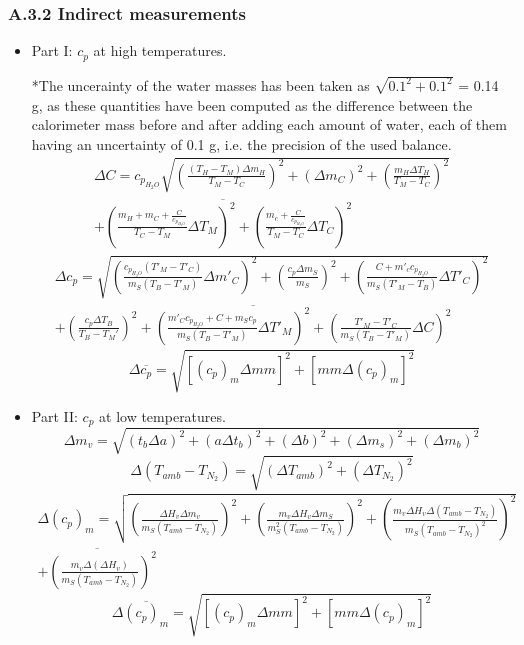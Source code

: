 \documentclass[a4paper, 12pt]{article}
\begin{document}
	\subsubsection{A.3.2 Indirect measurements}
	\begin{itemize}
		\item Part I: $c_p$ at high temperatures.
		
		*The uncerainty of the water masses has been taken as $\sqrt{0.1^2 + 0.1^2}$ = 0.14 g, as these quantities have been computed as the difference between the calorimeter mass before and after adding each amount of water, each of them having an uncertainty of 0.1 g, i.e. the precision of the used balance.
		\begin{multline}\label{dccalorimeter}
			\Delta C = c_{p_{H_2O}} \sqrt{\left(\frac{(T_H - T_M) \Delta m_H}{T_M - T_C}\right)^2 + (\Delta m_C)^2 + \left(\frac{m_H \Delta T_H}{T_M - T_C}\right)^2} \\ \overline{+ \left(\frac{m_H + m_C + %
					 \frac{C}{c_{p_{H_2O}}}}{T_C - T_M}\Delta T_M\right)^2 + \left(\frac{m_c + %
					 \frac{C}{c_{p_{H_2O}}}}{T_M - T_C}\Delta T_C\right)^2}
		\end{multline}
		\begin{multline}\label{dcp}
		\Delta c_p = \sqrt{\left(\frac{c_{p_{H_2O}} (T'_M - T'_C)}{m_S(T_B - T'_M)}\Delta m'_C \right)^2 + \left(\frac{c_p \Delta m_S}{m_S}\right)^2 + \left(\frac{C + m'_c c_{p_{H_2O}} }{m_S (T'_M - T_B)}\Delta T'_C\right)^2} \\ \overline{+ \left(\frac{c_p \Delta T_B}{T_B - T_M'}\right)^2 + \left(\frac{m'_C c_{p_{H_2O}} + C + m_S c_p}{m_S(T_B - T'_M)}\Delta T'_M\right)^2 + \left(\frac{T'_M - T'_C}{m_S(T_B - T'_M)}\Delta C\right)^2}
		\end{multline}
	\begin{equation}
		\Delta \overline{c_p} = \sqrt{[(c_p)_m\Delta mm]^2 + [mm \Delta (c_p)_m ]^2}
	\end{equation}
	\item Part II: $c_p$ at low temperatures.
\begin{equation}\label{dmvlow}
		\Delta m_v = \sqrt{(t_b\Delta a)^2 + (a\Delta t_b)^2 + (\Delta b)^2 + (\Delta m_s)^2 + (\Delta m_b)^2}
\end{equation}
\begin{equation}
	\Delta (T_{amb} - T_{N_2}) = \sqrt{(\Delta T_{amb})^2 + (\Delta T_{N_2})^2}
\end{equation}
\begin{multline}
	\Delta (c_p)_m = \sqrt{\left(\frac{\Delta H_v \Delta m_v}{m_S(T_{amb} - T_{N_2})}\right)^2 + \left(\frac{m_v\Delta H_v \Delta m_S}{m_S^2(T_{amb} - T_{N_2})}\right)^2 + \left(\frac{m_v\Delta H_v \Delta (T_{amb} - T_{N_2})}{m_S (T_{amb} - T_{N_2})^2}\right)^2 } \\ \overline{+ \left(\frac{m_v\Delta (\Delta H_v)}{m_S(T_{amb} - T_{N_2})}\right)^2}
\end{multline}
\begin{equation}
	\Delta \overline{(c_p)_m} = \sqrt{[(c_p)_m\Delta mm]^2 + [mm \Delta (c_p)_m ]^2}
\end{equation}
	\end{itemize}
\end{document}
